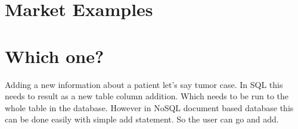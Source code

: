 \documentclass{article}
\begin{document}

\section{Market Examples}

\section{Which one?}
Adding a new information about a patient let's say tumor case. In SQL this needs to result as a new table column addition. Which needs to be run to the whole table in the database. However in NoSQL document based database this can be done easily with simple add statement. So the user can go and add. 



\end{document}
